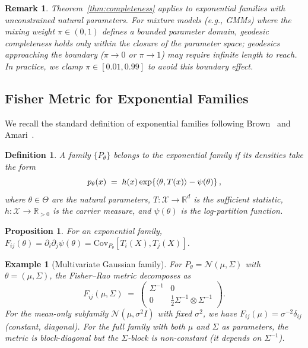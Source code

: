 \documentclass[a4paper,fleqn]{cas-dc}
\newtheorem{proposition}{Proposition}
\newtheorem{definition}{Definition}
\newtheorem{remark}{Remark}
\newtheorem{example}{Example}
\DeclarePairedDelimiter{\inner}{\langle}{\rangle}
\newcommand{\R}{\mathbb{R}}
\begin{document}
\begin{remark}%
  Theorem~\ref{thm:completeness} applies to exponential families with
  \emph{unconstrained} natural parameters.  For mixture models (e.g.,
  GMMs) where the mixing weight $\pi \in (0,1)$ defines a bounded
  parameter domain, geodesic completeness holds only within the
  \emph{closure} of the parameter space; geodesics approaching the
  boundary ($\pi \to 0$ or $\pi \to 1$) may require infinite length to
  reach.  In practice, we clamp $\pi \in [0.01, 0.99]$ to avoid this
  boundary effect.
\end{remark}

\subsection{Fisher Metric for Exponential Families}
\label{subsec:exp_family}
We recall the standard definition of exponential families following
Brown~\cite{brown1986fundamentals} and Amari~\cite{amari2000methods}.

\begin{definition}%
  \label{def:exp_family}
  A family $\{P_\theta\}$ belongs to the \emph{exponential family} if its
  densities take the form
  \begin{equation}
    p_\theta(x) \;=\; h(x)\exp\!\left\{\inner{\theta,T(x)} - \psi(\theta)\right\},
    \label{eq:exp_family}
  \end{equation}
  where $\theta\in\Theta$ are the \emph{natural parameters},
  $T:\mathcal{X}\to\R^d$ is the \emph{sufficient statistic},
  $h:\mathcal{X}\to\R_{>0}$ is the \emph{carrier measure}, and
  $\psi(\theta)$ is the \emph{log-partition function}.
\end{definition}

\begin{proposition}%
  \label{prop:fisher_exp}
  For an exponential family, $F_{ij}(\theta) = \partial_i\partial_j\psi(\theta)
  = \mathrm{Cov}_{P_\theta}[T_i(X), T_j(X)]$.
\end{proposition}

\begin{example}[Multivariate Gaussian family]
  \label{ex:gaussian}
  For $P_\theta = \mathcal{N}(\mu, \Sigma)$ with $\theta=(\mu,\Sigma)$,
  the Fisher--Rao metric decomposes as
  \begin{equation}
    F_{ij}(\mu,\Sigma) \;=\;
    \begin{pmatrix}
      \Sigma^{-1} & 0 \\
      0 & \frac{1}{2}\Sigma^{-1}\otimes\Sigma^{-1}
    \end{pmatrix}.
    \label{eq:fisher_gaussian}
  \end{equation}
  For the mean-only subfamily $\mathcal{N}(\mu,\sigma^2 I)$ with fixed
  $\sigma^2$, we have $F_{ij}(\mu) = \sigma^{-2}\delta_{ij}$ (constant,
  diagonal).
  For the \emph{full} family with both $\mu$ and $\Sigma$ as parameters,
  the metric is block-diagonal but the $\Sigma$-block is
  \emph{non-constant} (it depends on $\Sigma^{-1}$).
\end{example}
\end{document}
